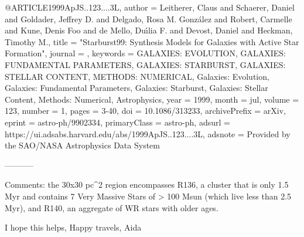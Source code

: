 @ARTICLE{1999ApJS..123....3L,
       author = {{Leitherer}, Claus and {Schaerer}, Daniel and {Goldader}, Jeffrey D. and {Delgado}, Rosa M. Gonz{\'a}lez and {Robert}, Carmelle and {Kune}, Denis Foo and {de Mello}, Du{\'\i}lia F. and {Devost}, Daniel and {Heckman}, Timothy M.},
        title = "{Starburst99: Synthesis Models for Galaxies with Active Star Formation}",
      journal = {\apjs},
     keywords = {GALAXIES: EVOLUTION, GALAXIES: FUNDAMENTAL PARAMETERS, GALAXIES: STARBURST, GALAXIES: STELLAR CONTENT, METHODS: NUMERICAL, Galaxies: Evolution, Galaxies: Fundamental Parameters, Galaxies: Starburst, Galaxies: Stellar Content, Methods: Numerical, Astrophysics},
         year = 1999,
        month = jul,
       volume = {123},
       number = {1},
        pages = {3-40},
          doi = {10.1086/313233},
archivePrefix = {arXiv},
       eprint = {astro-ph/9902334},
 primaryClass = {astro-ph},
       adsurl = {https://ui.adsabs.harvard.edu/abs/1999ApJS..123....3L},
      adsnote = {Provided by the SAO/NASA Astrophysics Data System}
}

-----------

Comments: the 30x30 pc^2 region encompasses R136, a cluster  that  is only 1.5 Myr and contains 7 Very Massive Stars of > 100 Msun (which live less than 2.5 Myr), and R140, an aggregate of WR stars with older ages.


I hope this helps,
Happy travels,
Aida
